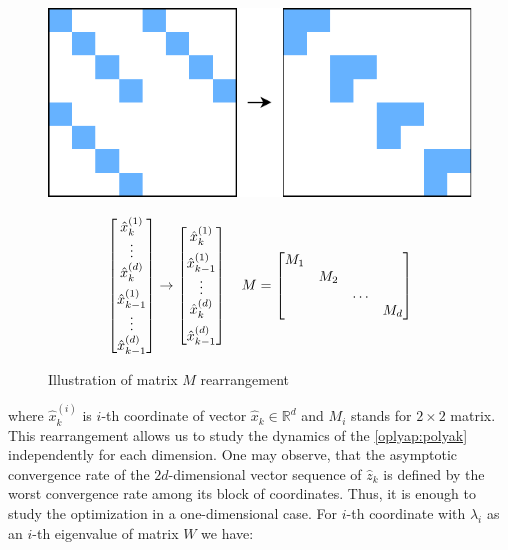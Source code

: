 \documentclass[a4paper,11pt]{article}
\begin{document}
\begin{figure}[h!]
 \centering
 \begin{minipage}{0.35\linewidth}
 \centering
 \includegraphics[width=\textwidth]{Rearranging_squares.pdf}
 \caption{Illustration of matrix $ M $ rearrangement}
 \label{oplyap:fig:rearrangement}
 \end{minipage}
 \hfill
 \begin{minipage}{0.6\linewidth}
 \centering
 \begin{equation}
 \begin{aligned}
 \begin{bmatrix} 
 \hat{x}_{k}^{(1)} \\
 \vdots \\
 \hat{x}_{k}^{(d)} \\
 \addlinespace 
 \hat{x}_{k-1}^{(1)} \\
 \vdots \\
 \hat{x}_{k-1}^{(d)}
 \end{bmatrix} \to 
 \begin{bmatrix} 
 \hat{x}_{k}^{(1)} \\
 \addlinespace 
 \hat{x}_{k-1}^{(1)} \\
 \vdots \\
 \hat{x}_{k}^{(d)} \\
 \addlinespace 
 \hat{x}_{k-1}^{(d)}
 \end{bmatrix} \quad M = \begin{bmatrix}
 M_1\\
 &M_2\\
 &&\ldots\\
 &&&M_d
 \end{bmatrix}
 \end{aligned}
 \label{oplyap:eq:rearrangement}
 \end{equation}
 \end{minipage}
\end{figure}
where $\hat{x}_{k}^{(i)}$ is $i$-th coordinate of vector $\hat{x}_{k} \in \mathbb{R}^d$ and $M_i$ stands for $2 \times 2$ matrix. This rearrangement allows us to study the dynamics of the \eqref{oplyap:polyak} independently for each dimension. One may observe, that the asymptotic convergence rate of the $2d$-dimensional vector sequence of $\hat{z}_k$ is defined by the worst convergence rate among its block of coordinates. Thus, it is enough to study the optimization in a one-dimensional case. For $i$-th coordinate with $\lambda_i$ as an $i$-th eigenvalue of matrix $W$ we have: 
\end{document}

